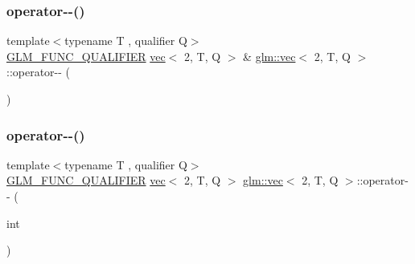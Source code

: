 \subsubsection{\texorpdfstring{operator-\/-\/()}{operator--()}\hspace{0.1cm}{\footnotesize\ttfamily [1/2]}}
{\footnotesize\ttfamily template$<$typename T , qualifier Q$>$ \\
\mbox{\hyperlink{setup_8hpp_a33fdea6f91c5f834105f7415e2a64407}{G\+L\+M\+\_\+\+F\+U\+N\+C\+\_\+\+Q\+U\+A\+L\+I\+F\+I\+ER}} \mbox{\hyperlink{structglm_1_1vec}{vec}}$<$ 2, T, Q $>$ \& \mbox{\hyperlink{structglm_1_1vec}{glm\+::vec}}$<$ 2, T, Q $>$\+::operator-\/-\/ (\begin{DoxyParamCaption}{ }\end{DoxyParamCaption})}

\mbox{\label{structglm_1_1vec_3_012_00_01_t_00_01_q_01_4_a6017c4f43c83945ca60837ec727f4c43}} 
\subsubsection{\texorpdfstring{operator-\/-\/()}{operator--()}\hspace{0.1cm}{\footnotesize\ttfamily [2/2]}}
{\footnotesize\ttfamily template$<$typename T , qualifier Q$>$ \\
\mbox{\hyperlink{setup_8hpp_a33fdea6f91c5f834105f7415e2a64407}{G\+L\+M\+\_\+\+F\+U\+N\+C\+\_\+\+Q\+U\+A\+L\+I\+F\+I\+ER}} \mbox{\hyperlink{structglm_1_1vec}{vec}}$<$ 2, T, Q $>$ \mbox{\hyperlink{structglm_1_1vec}{glm\+::vec}}$<$ 2, T, Q $>$\+::operator-\/-\/ (\begin{DoxyParamCaption}\item[{int}]{ }\end{DoxyParamCaption})}

\mbox{\label{structglm_1_1vec_3_012_00_01_t_00_01_q_01_4_a6961040865246e7250dd6cf13956d09e}} 
